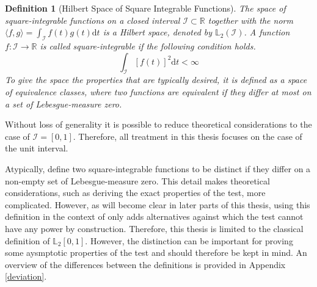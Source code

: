 \documentclass[12pt, a4paper]{article}
\theoremstyle{MAstyle} \newtheorem{assumption}{Assumption}[section]
\theoremstyle{MAstyle} \newtheorem{definition}{Definition}[section]
\theoremstyle{MAstyle} \newtheorem{theorem}{Theorem}[section]
\begin{document}
			\begin{definition}[Hilbert Space of Square Integrable Functions]
				The space of square-integrable functions on a closed interval $\mathcal{I} \subset \mathbb{R}$ together with the norm $\langle f,g\rangle = \int_{\mathcal{I}} f(t)g(t) \mathrm{d}t$ is a Hilbert space, denoted by $\mathbb{L}_2(\mathcal{I})$.
				A function $f: \mathcal{I} \rightarrow \mathbb{R}$ is called square-integrable if the following condition holds.
				\begin{equation}
					\int_{\mathcal{I}} \left[f(t)\right]^2\mathrm{d}t < \infty
				\end{equation}
				To give the space the properties that are typically desired, it is defined as a space of equivalence classes, where two functions are equivalent if they differ at most on a set of Lebesgue-measure zero. 
			\end{definition}
			Without loss of generality it is possible to reduce theoretical considerations to the case of $\mathcal{I} = [0,1]$. Therefore, all treatment in this thesis focuses on the case of the unit interval.
			
		 Atypically, \cite{bugni_permutation_2021} define two square-integrable functions to be distinct if they differ on a non-empty set of Lebesgue-measure zero. This detail makes theoretical considerations, such as deriving the exact properties of the test, more complicated. However, as will become clear in later parts of this thesis, using this definition in the context of \cite{bugni_permutation_2021} only adds alternatives against which the test cannot have any power by construction. Therefore, this thesis is limited to the classical definition of $\mathbb{L}_2[0,1]$. However, the distinction can be important for proving some aysmptotic properties of the test and should therefore be kept in mind.
		 An overview of the differences between the definitions is provided in Appendix \ref{deviation}.
\end{document}
